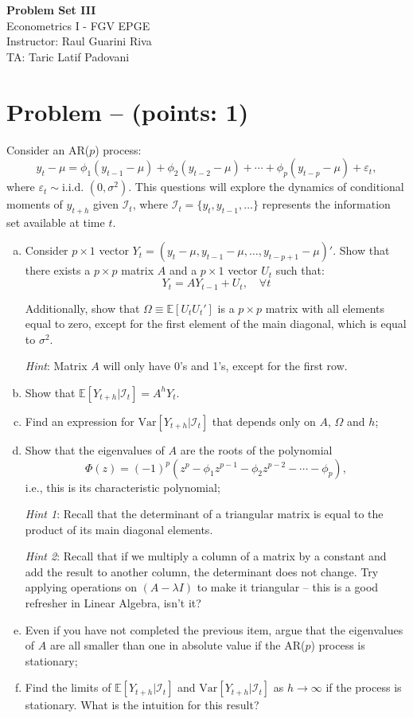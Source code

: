 \documentclass[11pt]{article}
\theoremstyle{definition}
\newcommand{\Var}{\mathrm{Var}}
\newcounter{problem}
\renewcommand{\theproblem}{\arabic{problem}}
\newcommand{\problem}[1]{
	\stepcounter{problem}
	\section*{Problem \theproblem{} -- (points: #1)}
}
\begin{document}
	\begin{center}
		{\LARGE{\textbf{Problem Set III}}}\\
		\vspace{0.2cm}
		Econometrics I - \textcolor{FGVBlue}{FGV EPGE}\\
		Instructor: Raul Guarini Riva \\
		TA: Taric Latif Padovani
	\end{center}

\problem{1}
Consider an AR($p$) process:
\begin{equation}
	y_t - \mu = \phi_1 (y_{t-1} - \mu) + \phi_2 (y_{t-2} - \mu) + \cdots + \phi_p (y_{t-p} - \mu) + \varepsilon_t,
	\label{eq:ar_p}
\end{equation}
where $\varepsilon_t \sim \text{i.i.d. } (0, \sigma^2)$. This questions will explore the dynamics of conditional moments of $y_{t+h}$ given $\mathcal{I}_t$, where $\mathcal{I}_t = \{y_t, y_{t-1}, \ldots\}$ represents the information set available at time $t$.

\begin{enumerate}[a)]
	\item Consider $p\times 1$ vector $Y_t = (y_t - \mu, y_{t-1} - \mu, \ldots, y_{t-p+1} - \mu)'$. Show that there exists a $p \times p$ matrix $A$ and a $p \times 1$ vector $U_t$ such that:
	\[Y_t = A Y_{t-1} + U_t, \quad \forall t\]

	Additionally, show that $\Omega \equiv \mathbb{E}[U_tU_t']$ is a $p \times p$ matrix with all elements equal to zero, except for the first element of the main diagonal, which is equal to $\sigma^2$.

	\textit{Hint}: Matrix $A$ will only have 0's and 1's, except for the first row.

	\item Show that $\mathbb{E}[Y_{t+h}|\mathcal{I}_t] = A^h Y_t$.
	\item Find an expression for $\Var[Y_{t+h}|\mathcal{I}_t]$ that depends only on $A$, $\Omega$ and $h$;
	\item Show that the eigenvalues of $A$ are the roots of the polynomial \[\Phi(z) = (-1)^{p}\left(z^p - \phi_1 z^{p-1} - \phi_2 z^{p-2} - \cdots - \phi_p\right),\] i.e., this is its characteristic polynomial;
	
	\textit{Hint 1}: Recall that the determinant of a triangular matrix is equal to the product of its main diagonal elements.
	
	\textit{Hint 2}: Recall that if we multiply a column of a matrix by a constant and add the result to another column, the determinant does not change. Try applying operations on $(A - \lambda I)$ to make it triangular -- this is a good refresher in Linear Algebra, isn't it? 

	\item Even if you have not completed the previous item, argue that the eigenvalues of $A$ are all smaller than one in absolute value if the AR($p$) process is stationary;
	\item Find the limits of $\mathbb{E}[Y_{t+h}|\mathcal{I}_t]$ and $\Var[Y_{t+h}|\mathcal{I}_t]$ as $h \to \infty$ if the process is stationary. What is the intuition for this result?
\end{enumerate}
\end{document}
